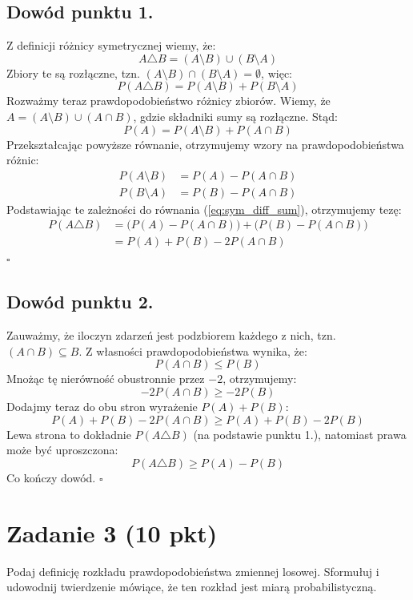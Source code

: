 \documentclass[polish, 10pt]{extarticle}
\theoremstyle{definition}
\begin{document}
\subsection*{Dowód punktu 1.}
Z definicji różnicy symetrycznej wiemy, że:
\[ A \triangle B = (A \setminus B) \cup (B \setminus A) \]
Zbiory te są rozłączne, tzn. $(A \setminus B) \cap (B \setminus A) = \emptyset$, więc:
\begin{equation}
    P(A \triangle B) = P(A \setminus B) + P(B \setminus A) \label{eq:sym_diff_sum}
\end{equation}
Rozważmy teraz prawdopodobieństwo różnicy zbiorów. Wiemy, że $A = (A \setminus B) \cup (A \cap B)$, gdzie składniki sumy są rozłączne. Stąd:
\[ P(A) = P(A \setminus B) + P(A \cap B) \]
Przekształcając powyższe równanie, otrzymujemy wzory na prawdopodobieństwa różnic:
\begin{align*}
    P(A \setminus B) &= P(A) - P(A \cap B) \\
    P(B \setminus A) &= P(B) - P(A \cap B)
\end{align*}
Podstawiając te zależności do równania (\ref{eq:sym_diff_sum}), otrzymujemy tezę:
\begin{align*}
    P(A \triangle B) &= \bigl( P(A) - P(A \cap B) \bigr) + \bigl( P(B) - P(A \cap B) \bigr) \\
    &= P(A) + P(B) - 2P(A \cap B)
\end{align*}
\hfill $\square$

\subsection*{Dowód punktu 2.}
Zauważmy, że iloczyn zdarzeń jest podzbiorem każdego z nich, tzn. $(A \cap B) \subseteq B$. Z własności prawdopodobieństwa wynika, że:
\[ P(A \cap B) \leq P(B) \]
Mnożąc tę nierówność obustronnie przez $-2$, otrzymujemy:
\[ -2P(A \cap B) \geq -2P(B) \]
Dodajmy teraz do obu stron wyrażenie $P(A) + P(B)$:
\[ P(A) + P(B) - 2P(A \cap B) \geq P(A) + P(B) - 2P(B) \]
Lewa strona to dokładnie $P(A \triangle B)$ (na podstawie punktu 1.), natomiast prawa może być uproszczona:
\[ P(A \triangle B) \geq P(A) - P(B) \]
Co kończy dowód.
\hfill $\square$

\section*{Zadanie 3 (10 pkt)}
Podaj definicję rozkładu prawdopodobieństwa zmiennej losowej. Sformułuj i udowodnij twierdzenie mówiące, że ten rozkład jest miarą probabilistyczną.
\end{document}
